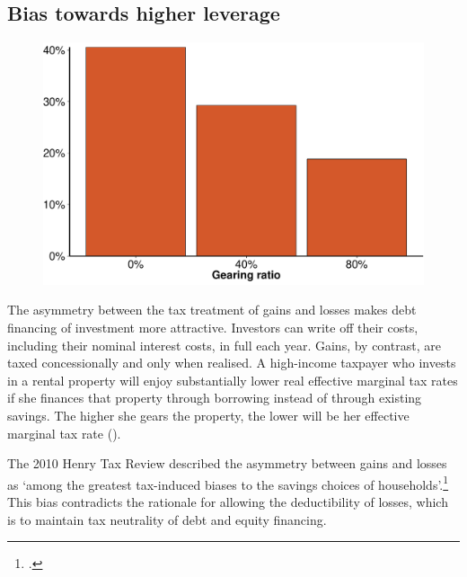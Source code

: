 \subsection{Bias towards higher leverage}
\begin{figure}
\label{fig:EMTR-by-gearing}

\includegraphics[width=\columnwidth]{CGT-NG-atlas//EMTR-by-gearing-1}

\end{figure}

The asymmetry between the tax treatment of gains and losses makes debt financing of investment more attractive. Investors can write off their costs, including their nominal interest costs, in full each year. 
Gains, by contrast, are taxed concessionally and only when realised. 
A high-income taxpayer who invests in a rental property will enjoy substantially lower real effective marginal tax rates if she finances that property through borrowing instead of through existing savings. The higher she gears the property, the lower will be her effective marginal tax rate (). 

The 2010 Henry Tax Review described the asymmetry between gains and losses as ‘among the greatest tax-induced biases to the savings choices of households’.\footcite[][69]{HenryTaxReview2010} This bias contradicts the rationale for allowing the deductibility of losses, which is to maintain tax neutrality of debt and equity financing.

